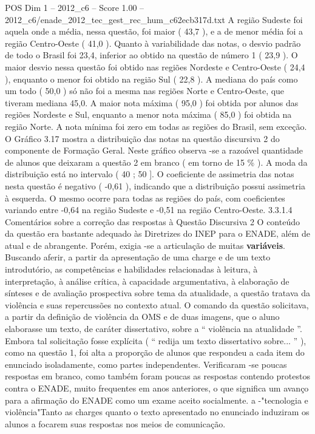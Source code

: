 \begin{textsample}{POS Dim 1 – 2012\_c6 – Score 1.00 – 2012\_c6/enade\_2012\_tec\_gest\_rec\_hum\_c62ecb317d.txt}
A região Sudeste foi aquela onde a média, nessa questão, foi maior ( 43,7 ), e a de menor média foi a região Centro-Oeste ( 41,0 ).
Quanto à variabilidade das notas, o desvio padrão de todo o Brasil foi 23,4, inferior ao obtido na questão de número 1 ( 23,9 ).
O maior desvio nessa questão foi obtido nas regiões Nordeste e Centro-Oeste ( 24,4 ), enquanto o menor foi obtido na região Sul ( 22,8 ).
A mediana do país como um todo ( 50,0 ) só não foi a mesma nas regiões Norte e Centro-Oeste, que tiveram mediana 45,0.
A maior nota máxima ( 95,0 ) foi obtida por alunos das regiões Nordeste e Sul, enquanto a menor nota máxima ( 85,0 ) foi obtida na região Norte.
A nota mínima foi zero em todas as regiões do Brasil, sem exceção.
O Gráfico 3.17 mostra a distribuição das notas na questão discursiva 2 do componente de Formação Geral.
Neste gráfico observa -se a razoável quantidade de alunos que deixaram a questão 2 em branco ( em torno de 15 \% ).
A moda da distribuição está no intervalo ( 40 ; 50 ].
O coeficiente de assimetria das notas nesta questão é negativo ( -0,61 ), indicando que a distribuição possui assimetria à esquerda.
O mesmo ocorre para todas as regiões do país, com coeficientes variando entre -0,64 na região Sudeste e -0,51 na região Centro-Oeste. 3.3.1.4 Comentários sobre a correção das respostas à Questão Discursiva 2 O conteúdo da questão era bastante adequado às Diretrizes do INEP para o ENADE, além de atual e de abrangente.
Porém, exigia -se a articulação de muitas \textbf{variáveis}.
Buscando aferir, a partir da apresentação de uma charge e de um texto introdutório, as competências e habilidades relacionadas à leitura, à interpretação, à análise crítica, à capacidade argumentativa, à elaboração de sínteses e de avaliação prospectiva sobre tema da atualidade, a questão tratava da violência e suas repercussões no contexto atual.
O comando da questão solicitava, a partir da definição de violência da OMS e de duas imagens, que o aluno elaborasse um texto, de caráter dissertativo, sobre a “ violência na atualidade ”.
Embora tal solicitação fosse explícita ( “ redija um texto dissertativo sobre... ” ), como na questão 1, foi alta a proporção de alunos que respondeu a cada item do enunciado isoladamente, como partes independentes.
Verificaram -se poucas respostas em branco, como também foram poucas as respostas contendo protestos contra o ENADE, muito frequentes em anos anteriores, o que significa um avanço para a afirmação do ENADE como um exame aceito socialmente. a -"tecnologia e violência"Tanto as charges quanto o texto apresentado no enunciado induziram os alunos a focarem suas respostas nos meios de comunicação.

\end{textsample}
